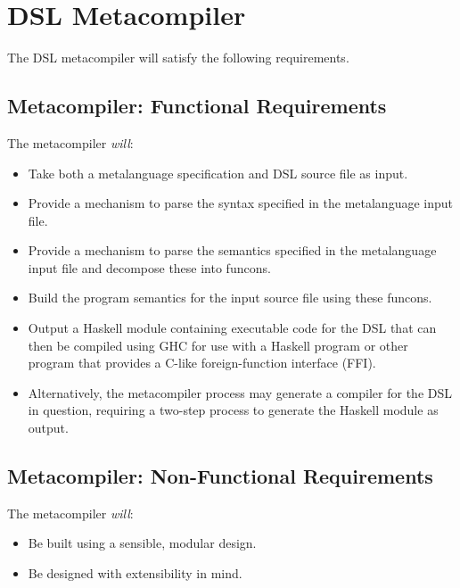 \documentclass[a4paper,11pt]{report}
\begin{document}


\section{DSL Metacompiler} %
\label{sec:dsl_metacompiler}
The DSL metacompiler will satisfy the following requirements.

\subsection{Metacompiler: Functional Requirements} %
\label{sub:metacompiler_functional_requirements}
The metacompiler \textit{will}:
\begin{itemize}
    \item Take both a metalanguage specification and DSL source file as input.
    \item Provide a mechanism to parse the syntax specified in the metalanguage input file.
    \item Provide a mechanism to parse the semantics specified in the metalanguage input file and decompose these into funcons.
    \item Build the program semantics for the input source file using these funcons.
    \item Output a Haskell module containing executable code for the DSL that can then be compiled using GHC for use with a Haskell program or other program that provides a C-like foreign-function interface (FFI).
    \item Alternatively, the metacompiler process may generate a compiler for the DSL in question, requiring a two-step process to generate the Haskell module as output. 
\end{itemize}


\subsection{Metacompiler: Non-Functional Requirements} %
\label{sub:metacompiler_non_functional_requirements}
The metacompiler \textit{will}:
\begin{itemize}
    \item Be built using a sensible, modular design.
    \item Be designed with extensibility in mind.
\end{itemize}
\end{document}
